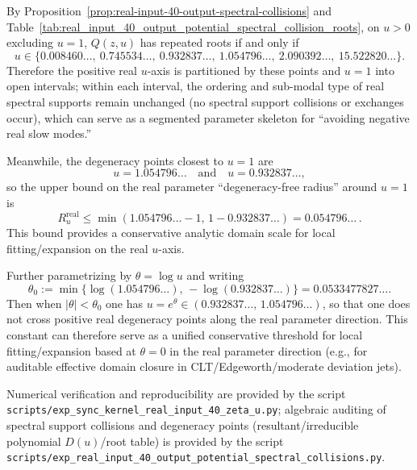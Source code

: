 \begin{remark}\label{rem:real-input-40-output-potential-degeneracy-phase}
By Proposition~\ref{prop:real-input-40-output-spectral-collisions} and Table~\ref{tab:real_input_40_output_potential_spectral_collision_roots}, on \(u>0\) excluding \(u=1\), \(Q(z,u)\) has repeated roots if and only if
\[
u\in\{0.008460\ldots,\ 0.745534\ldots,\ 0.932837\ldots,\ 1.054796\ldots,\ 2.090392\ldots,\ 15.522820\ldots\}.
\]
Therefore the positive real \(u\)-axis is partitioned by these points and \(u=1\) into open intervals; within each interval, the ordering and sub-modal type of real spectral supports remain unchanged (no spectral support collisions or exchanges occur), which can serve as a segmented parameter skeleton for ``avoiding negative real slow modes.''
\par
Meanwhile, the degeneracy points closest to \(u=1\) are
\[
u=1.054796\ldots\quad\text{and}\quad u=0.932837\ldots,
\]
so the upper bound on the real parameter ``degeneracy-free radius'' around \(u=1\) is
\[
R_u^{\mathrm{real}}\le \min(1.054796\ldots-1,\,1-0.932837\ldots)=0.054796\ldots\,.
\]
This bound provides a conservative analytic domain scale for local fitting/expansion on the real \(u\)-axis.
\par
Further parametrizing by \(\theta=\log u\) and writing
\[
\theta_0:=\min\{\log(1.054796\ldots),\,-\log(0.932837\ldots)\}
=0.0533477827\ldots.
\]
Then when \(|\theta|<\theta_0\) one has \(u=e^\theta\in(0.932837\ldots,\,1.054796\ldots)\),
so that one does not cross positive real degeneracy points along the real parameter direction.
This constant can therefore serve as a unified conservative threshold for local fitting/expansion based at \(\theta=0\) in the real parameter direction (e.g., for auditable effective domain closure in CLT/Edgeworth/moderate deviation jets).
\end{remark}
Numerical verification and reproducibility are provided by the script \texttt{scripts/exp\_sync\_kernel\_real\_input\_40\_zeta\_u.py}; algebraic auditing of spectral support collisions and degeneracy points (resultant/irreducible polynomial $D(u)$/root table) is provided by the script \texttt{scripts/exp\_real\_input\_40\_output\_potential\_spectral\_collisions.py}.
